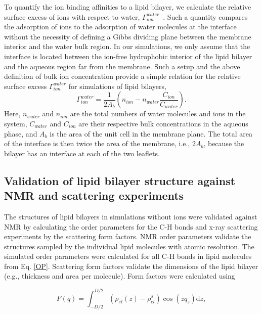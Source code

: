 \documentclass[aip,jcp,twocolumn]{revtex4}
\begin{document}
To quantify the ion binding affinities to a lipid bilayer, we calculate the relative surface excess of ions with respect to water, $\Gamma_{ion}^{water}$~\cite{chattorajBOOK}. Such a quantity compares the adsorption of ions to the adsorption of water molecules at the interface without the necessity of defining a Gibbs dividing plane between the membrane interior and the water bulk region. In our simulations, we only assume that the interface is located between the ion-free hydrophobic interior of the lipid bilayer and the aqueous region far from the membrane.  Such a setup and the above definition of bulk ion concentration provide a simple relation for the relative surface excess $\Gamma_{ion}^{water}$ for simulations of lipid bilayers,
 \begin{equation}\label{surfexcess}
  \Gamma_{ion}^{water}=\frac{1}{2A_b} \left ( n_{ion} - n_{water} \frac{C_{ion}}{C_{water}} \right ).
\end{equation}
Here, $n_{water}$ and $n_{ion}$ are the total numbers of water molecules and ions in the system,
$C_{water}$ and $C_{ion}$ are their respective bulk concentrations in the aqueous phase,
and $A_b$ is the area of the unit cell in the membrane plane.
The total area of the interface is then twice the area of the membrane, i.e., $2A_b$,
because the bilayer has an interface at each of the two leaflets.



\subsection{Validation of lipid bilayer structure against NMR and scattering experiments}
The structures of lipid bilayers in simulations without ions were validated against NMR by calculating the order parameters for the C-H bonds and \mbox{x-ray} scattering experiments by the scattering form factors. NMR order parameters validate the structures sampled by the individual lipid molecules with atomic resolution. The simulated order parameters were calculated for all C-H bonds in lipid molecules from Eq. \ref{OP}. Scattering form factors validate the dimensions of the lipid bilayer (e.g., thickness and area per molecule). Form factors were calculated using

\begin{equation}
  F(q) = \int _{-D/2} ^{D/2} \left ( \rho_{el}(z) - \rho_{el}^s \right ) \cos (zq_z) \mathrm{d}z,
\end{equation}
\end{document}
